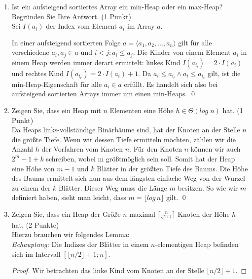 \documentclass[ngerman,landscape,twocolumn]{adtexsheet}
\begin{document}
\begin{question}
    \begin{enumerate}
    \item Ist ein aufsteigend sortiertes Array ein min-Heap oder ein max-Heap? Begründen Sie Ihre Antwort. (1 Punkt) \\
    
        Sei $I(a_i)$ der Index vom Element $a_i$ im Array $a$.
        
        In einer aufsteigend sortierten Folge $a = \langle a_1, a_2, \ldots, a_n \rangle$ gilt für alle verschiedene $a_i, a_j \in a$ und $i < j : a_i \leq a_j$. Die Kinder von einem Element $a_i$ in einem Heap werden immer derart ermittelt: linkes Kind $ I(a_{i_l})= 2 \cdot I(a_i)$ und rechtes Kind $I(a_{i_r})= 2 \cdot I(a_i)+ 1$. Da $a_i \leq a_{i_l} \land a_i \leq a_{i_r}$ gilt, ist die min-Heap-Eigenschaft für alle $a_i \in a$ erfüllt. Es handelt sich also bei aufsteigend sortierten Arrays immer um einen min-Heaps. \qed
        
    \item Zeigen Sie, dass ein Heap mit $n$ Elementen eine Höhe $h \in \Theta(log \; n)$ hat. (1 Punkt) \\
    
        Da Heaps links-vollständige Binärbäume sind, hat der Knoten an der Stelle $n$ die größte Tiefe. Wenn wir dessen Tiefe ermitteln möchten, zählen wir die Anzahl $h$ der Vorfahren vom Knoten $n$.
        Für den Knoten $n$ können wir auch $2^m-1 + k$ schreiben, wobei m größtmöglich sein soll.
        Somit hat der Heap eine Höhe von $m-1$ und $k$ Blätter in der größten Tiefe des Baums.
        Die Höhe des Baums ermittelt sich nun aus dem längsten einfache Weg von der Wurzel zu einem der $k$ Blätter. Dieser Weg muss die Länge $m$ besitzen. So wie wir $m$ definiert haben, sieht man leicht, dass $m= \lfloor log\,n \rfloor$ gilt. \qed

    \item Zeigen Sie, dass ein Heap der Größe $n$ maximal $\lceil \frac{n}{2^{h+1}} \rceil$ Knoten der Höhe $h$ hat. (2 Punkte) \\
        
        Hierzu brauchen wir folgendes Lemma:\\
        \emph{Behauptung:} Die Indizes der Blätter in einem $n$-elementigen Heap befinden sich im Intervall $\left[\lfloor n/2 \rfloor+1; n\right]$.
        \begin{proof}
        Wir betrachten das linke Kind vom Knoten an der Stelle $\lfloor n/2 \rfloor + 1$.
        

\end{proof}
\end{enumerate}
\end{question}
\end{document}
